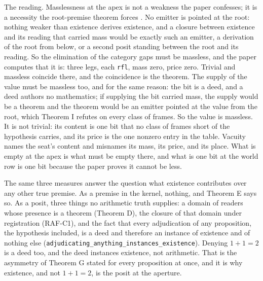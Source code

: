 \documentclass[10pt,twocolumn]{article}
\begin{document}
The reading. Masslessness at the apex is not a weakness the paper
confesses; it is a necessity the root-premise theorem forces
\cite{islamcodex}. No emitter is pointed at the root: nothing weaker
than existence derives existence, and a closure between existence and
its reading that carried mass would be exactly such an emitter, a
derivation of the root from below, or a second posit standing between
the root and its reading. So the elimination of the category gaps must
be massless, and the paper computes that it is: three legs, each
\texttt{rfl}, mass zero, price zero. Trivial and massless coincide
there, and the coincidence is the theorem. The supply of the value must
be massless too, and for the same reason: the bit is a deed, and a deed
authors no mathematics; if supplying the bit carried mass, the supply
would be a theorem and the theorem would be an emitter pointed at the
value from the root, which Theorem I refutes on every class of frames.
So the value is massless. It is not trivial: its content is one bit that
no class of frames short of the hypothesis carries, and its price is the
one nonzero entry in the table. Vacuity names the seat's content and
misnames its mass, its price, and its place. What is empty at the apex
is what must be empty there, and what is one bit at the world row is one
bit because the paper proves it cannot be less.

The same three measures answer the question what existence contributes
over any other true premise. As a premise in the kernel, nothing, and
Theorem E says so. As a posit, three things no arithmetic truth
supplies: a domain of readers whose presence is a theorem (Theorem D),
the closure of that domain under registration (RAF-C1), and the fact
that every adjudication of any proposition, the hypothesis included, is
a deed and therefore an instance of existence and of nothing else
(\texttt{adjudicating\_\allowbreak anything\_\allowbreak instances\_\allowbreak existence}).
Denying \(1 + 1 = 2\) is a deed too, and the deed instances existence,
not arithmetic. That is the asymmetry of Theorem G stated for every
proposition at once, and it is why existence, and not \(1 + 1 = 2\), is
the posit at the aperture.

\par\vspace{1.4em}\noindent{\color{accent}\rule{\columnwidth}{0.8pt}}\par{}\vspace{0.5em}\noindent{\color{accent}\rule{\columnwidth}{0.8pt}}\par\vspace{1.0em}
\end{document}

